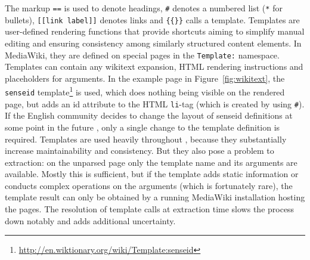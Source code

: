 The markup \texttt{==} is used to denote headings, \texttt{\#} denotes a numbered list (\texttt{*} for bullets), \texttt{[[link label]]} denotes links and \texttt{\{\{\}\}} calls a template.
Templates are user-defined rendering functions that provide shortcuts aiming to simplify manual editing and ensuring consistency among similarly structured content elements. 
In MediaWiki, they are defined on special pages in the \texttt{Template:} namespace. 
Templates can contain any wikitext expansion, HTML rendering instructions and placeholders for arguments. 
In the example page in Figure~\ref{fig:wikitext}, the \texttt{senseid} template\footnote{\url{http://en.wiktionary.org/wiki/Template:senseid}} is used, which does nothing being visible on the rendered page, but adds an id attribute to the HTML \texttt{li}-tag (which is created by using \texttt{\#}).
If the English \wik community decides to change the layout of senseid definitions at some point in the future , only a single change to the template definition is required. 
Templates are used heavily throughout \wik, because they substantially increase maintainability and consistency. 
But they also pose a problem to extraction: on the unparsed page only the template name and its arguments are available.
Mostly this is sufficient, but if the template adds static information or conducts complex operations on the arguments (which is fortunately rare), the template result can only be obtained by a running MediaWiki installation hosting the pages. 
The resolution of template calls at extraction time slows the process down notably and adds additional uncertainty.

